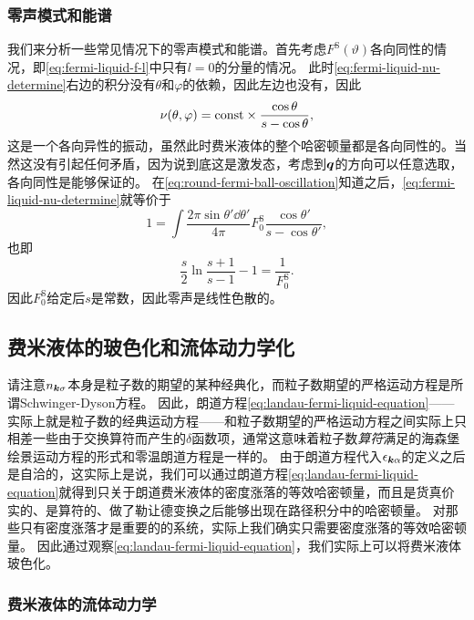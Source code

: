 
\subsubsection{零声模式和能谱}

我们来分析一些常见情况下的零声模式和能谱。首先考虑$F^\text{S}(\vartheta)$各向同性的情况，即\eqref{eq:fermi-liquid-f-l}中只有$l=0$的分量的情况。
此时\eqref{eq:fermi-liquid-nu-determine}右边的积分没有$\theta$和$\varphi$的依赖，因此左边也没有，因此
\begin{equation}
    \nu(\theta, \varphi) = \mathrm{const} \times \frac{\cos \theta}{s - \cos \theta},
    \label{eq:round-fermi-ball-oscillation}
\end{equation}
这是一个各向异性的振动，虽然此时费米液体的整个哈密顿量都是各向同性的。当然这没有引起任何矛盾，因为说到底这是激发态，考虑到$\vb*{q}$的方向可以任意选取，各向同性是能够保证的。
在\eqref{eq:round-fermi-ball-oscillation}知道之后，\eqref{eq:fermi-liquid-nu-determine}就等价于
\[
    1 = \int \frac{2 \pi \sin \theta' \dd{\theta'}}{4\pi} F^\text{S}_0 \frac{\cos \theta'}{s - \cos \theta'},
\]
也即
\begin{equation}
    \frac{s}{2} \ln\frac{s+1}{s-1} - 1 = \frac{1}{F^\text{S}_0}.
\end{equation}
因此$F^\text{S}_0$给定后$s$是常数，因此零声是线性色散的。

\subsection{费米液体的玻色化和流体动力学化}

请注意$n_{\vb*{k} \sigma}$本身是粒子数的期望的某种经典化，而粒子数期望的严格运动方程是所谓Schwinger-Dyson方程。
因此，朗道方程\eqref{eq:landau-fermi-liquid-equation}——实际上就是粒子数的经典运动方程——和粒子数期望的严格运动方程之间实际上只相差一些由于交换算符而产生的$\delta$函数项，通常这意味着粒子数\emph{算符}满足的海森堡绘景运动方程的形式和零温朗道方程是一样的。
由于朗道方程代入$\epsilon_{\vb*{k} \alpha}$的定义之后是自洽的，这实际上是说，我们可以通过朗道方程\eqref{eq:landau-fermi-liquid-equation}就得到只关于朗道费米液体的密度涨落的等效哈密顿量，而且是货真价实的、是算符的、做了勒让德变换之后能够出现在路径积分中的哈密顿量。
对那些只有密度涨落才是重要的的系统，实际上我们确实只需要密度涨落的等效哈密顿量。
因此通过观察\eqref{eq:landau-fermi-liquid-equation}，我们实际上可以将费米液体玻色化。

\subsubsection{费米液体的流体动力学}


